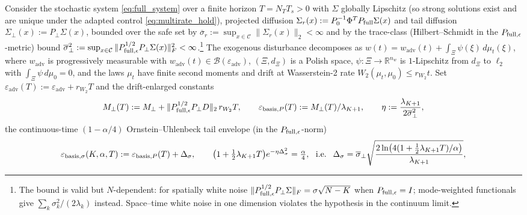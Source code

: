 \begin{corollary}
\label{cor:stochastic_w2}
Consider the stochastic system \eqref{eq:full_system} over a finite horizon \(T = N_T T_s > 0\) with \(\Sigma\) globally Lipschitz (so strong solutions exist and are unique under the adapted control \eqref{eq:multirate_hold}), projected diffusion \(\Sigma_r(x) := P_0^{-1}\Phi^TP_{\mathrm{full}}\Sigma(x)\) and tail diffusion \(\Sigma_\perp(x) := P_\perp\Sigma(x)\), bounded over the safe set by \(\overline{\sigma}_r := \sup_{x \in \mathcal{C}} \|\Sigma_r(x)\|_2 < \infty\) and by the trace-class (Hilbert--Schmidt in the \(P_{\mathrm{full},\epsilon}\)-metric) bound \(\overline{\sigma}_\perp^2 := \sup_{x \in \mathcal{C}}\|P_{\mathrm{full},\epsilon}^{1/2} P_\perp \Sigma(x)\|_F^2 < \infty\).\footnote{The bound is valid but \(N\)-dependent: for spatially white noise \(\|P_{\mathrm{full},\epsilon}^{1/2}P_\perp\Sigma\|_F = \sigma\sqrt{N-K}\) when \(P_{\mathrm{full},\epsilon} = I\); mode-weighted functionals give \(\sum_k\sigma_k^2/(2\lambda_k)\) instead. Space--time white noise in one dimension violates the hypothesis in the continuum limit.} The exogenous disturbance decomposes as \(w(t) = w_{\mathrm{adv}}(t) + \int_\Xi \psi(\xi)\,d\mu_t(\xi)\), where \(w_{\mathrm{adv}}\) is progressively measurable with \(w_{\mathrm{adv}}(t) \in \mathcal{B}(\varepsilon_{\mathrm{adv}})\), \((\Xi, d_\Xi)\) is a Polish space, \(\psi : \Xi \to \mathbb{R}^{n_w}\) is \(1\)-Lipschitz from \(d_\Xi\) to \(\ell_2\) with \(\int_\Xi \psi\,d\mu_0 = 0\), and the laws \(\mu_t\) have finite second moments and drift at Wasserstein-2 rate \(W_2(\mu_t, \mu_0) \le r_{W_2} t\). Set \(\varepsilon_{\mathrm{adv}}(T) := \varepsilon_{\mathrm{adv}} + r_{W_2}T\) and the drift-enlarged constants
\[
M_\perp(T) := M_\perp + \|P_{\mathrm{full},\epsilon}^{1/2}P_\perp D\|_2\,r_{W_2}T, \qquad \varepsilon_{\mathrm{basis},P}(T) := M_\perp(T)/\lambda_{K+1}, \qquad \eta := \frac{\lambda_{K+1}}{2\overline{\sigma}_\perp^2},
\]
the continuous-time \((1 - \alpha/4)\) Ornstein--Uhlenbeck tail envelope (in the \(P_{\mathrm{full},\epsilon}\)-norm)
\[
\varepsilon_{\mathrm{basis},\sigma}(K, \alpha, T) := \varepsilon_{\mathrm{basis},P}(T) + \Delta_\sigma, \qquad \big(1 + \tfrac12\lambda_{K+1}T\big)e^{-\eta\Delta_\sigma^2} = \tfrac{\alpha}{4}, \ \text{ i.e. }\ \Delta_\sigma = \overline{\sigma}_\perp\sqrt{\frac{2\ln\!\big(4(1 + \frac{1}{2}\lambda_{K+1}T)/\alpha\big)}{\lambda_{K+1}}},
\]

\end{corollary}
